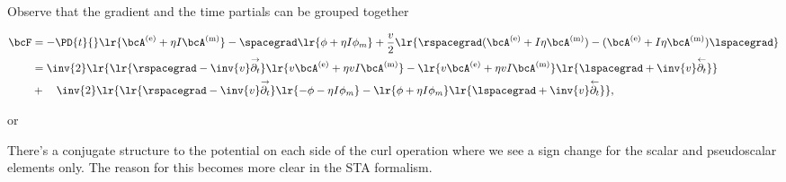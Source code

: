 Observe that the
gradient and the time partials can be grouped together

\begin{equation}\label{eqn:potentialMethods:1060}
\begin{aligned}
\bcF
&=
- \PD{t}{ } \lr{\bcA^\e + \eta I \bcA^\m}
- \spacegrad \lr{ \phi + \eta I \phi_m }
+ \frac{v}{2} \lr{ \rspacegrad (\bcA^\e + I \eta \bcA^\m) - (\bcA^\e + I \eta \bcA^\m) \lspacegrad } \\
&=
\inv{2} \lr{
   \lr{ \rspacegrad - \inv{v} \rpartialt } \lr{ v \bcA^\e + \eta v I \bcA^\m }
   -
   \lr{ v \bcA^\e + \eta v I \bcA^\m} \lr{ \lspacegrad + \inv{v} \lpartialt }
} \\
&+\quad \inv{2} \lr{
   \lr{ \rspacegrad - \inv{v} \rpartialt } \lr{ -\phi - \eta I \phi_m }
   - \lr{ \phi + \eta I \phi_m } \lr{ \lspacegrad + \inv{v} \lpartialt }
}
,
\end{aligned}
\end{equation}

or


There's a conjugate structure to the potential on each side of the curl operation where we see a sign change for the scalar and pseudoscalar elements only.  The reason for this becomes more clear in the STA formalism.

